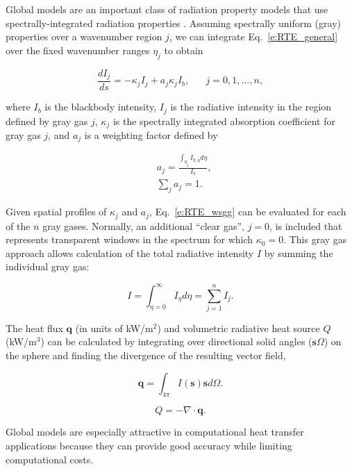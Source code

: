 \documentclass[preprint,12pt]{elsarticle}
\newcounter{bla}
\begin{document}
Global models are an important class of radiation property models that use spectrally-integrated radiation properties \cite{Hottel_1967,Modest_2013,Modest_2016}. Assuming spectrally uniform (gray) properties over a wavenumber region $j$, we can integrate Eq.~\ref{e:RTE_general} over the fixed wavenumber ranges $\eta_j$ to obtain
%
\begin{linenomath}
\begin{equation} \label{e:RTE_wsgg}
    \frac{dI_j}{ds} = -\kappa_jI_j + a_j\kappa_jI_b, \hspace{20pt} j=0,1,...,n,
\end{equation}
\end{linenomath}
%
where $I_b$ is the blackbody intensity, $I_j$ is the radiative intensity in the region defined by gray gas $j$, $\kappa_j$ is the spectrally integrated absorption coefficient for gray gas $j$, and $a_j$ is a weighting factor defined by
%
\begin{linenomath}
\begin{align}
    &a_j= \frac{\int_{\eta_j}I_{b,\eta}d\eta}{I_b},\\
    &\sum_j a_j = 1.
\end{align}
\end{linenomath}
%
Given spatial profiles of $\kappa_j$ and $a_j$, Eq.~\ref{e:RTE_wsgg} can be evaluated for each of the $n$ gray gases. Normally, an additional ``clear gas'', $j=0$, is included that represents transparent windows in the spectrum for which $\kappa_0=0$. This gray gas approach allows calculation of the total radiative intensity $I$ by summing the individual gray gas:
%
\begin{linenomath}
\begin{equation}
I=\int_{\eta=0}^{\infty}I_{\eta}d\eta=\sum_{j=1}^n I_j.
\end{equation}
\end{linenomath}
%

The heat flux $\mathbf{q}$ (in units of kW/m$^2$) and volumetric radiative heat source $Q$ (kW/m$^3$) can be calculated by integrating over directional solid angles ($\mathbf{s}\Omega$) on the sphere and finding the divergence of the resulting vector field,
%
\begin{linenomath}
\begin{equation}
    \mathbf{q} = \int_{4\pi}I(\mathbf{s})\mathbf{s}d\Omega.
\end{equation}
\end{linenomath}
%
\begin{linenomath}
\begin{equation}
    Q = -\nabla\cdot\mathbf{q}.
\end{equation}
\end{linenomath}
%
Global models are especially attractive in computational heat transfer applications because they can provide good accuracy while limiting computational costs.
\end{document}
